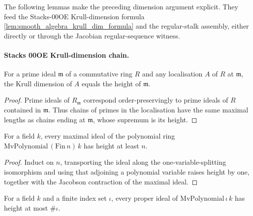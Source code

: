The following lemmas make the preceding dimension argument explicit. They feed
the Stacks-00OE Krull-dimension formula
\cref{lem:smooth_algebra_krull_dim_formula} and the regular-stalk assembly,
either directly or through the Jacobian regular-sequence witness.

\paragraph{Stacks 00OE Krull-dimension chain.}

\begin{lemma}\leanok
  \label{lem:ringKrullDim_localization_eq_height_atPrime}
  For a prime ideal \(\mathfrak m\) of a commutative ring \(R\) and any localisation
  \(A\) of \(R\) at \(\mathfrak m\), the Krull dimension of \(A\) equals the height of
  \(\mathfrak m\).
\end{lemma}

\begin{proof}
  Prime ideals of \(R_{\mathfrak m}\) correspond order-preservingly to
  prime ideals of \(R\) contained in \(\mathfrak m\).  Thus chains of
  primes in the localisation have the same maximal lengths as chains
  ending at \(\mathfrak m\), whose supremum is its height.
\end{proof}

\begin{lemma}
  \label{lem:mvPolynomial_maximalIdeal_height_ge_card}
  For a field \(k\), every maximal ideal of the polynomial ring
  \(\mathrm{MvPolynomial}\,(\mathrm{Fin}\,n)\,k\) has height at least \(n\).
\end{lemma}

\begin{proof}
  Induct on \(n\), transporting the ideal along the
  one-variable-splitting isomorphism and using that adjoining a polynomial variable
  raises height by one, together with the Jacobson contraction of the maximal ideal.
\end{proof}

\begin{lemma}
  \label{lem:mvPolynomial_maximalIdeal_height_le_natCard}
  For a field \(k\) and a finite index set \(\iota\), every proper ideal of
  \(\mathrm{MvPolynomial}\,\iota\,k\) has height at most \(\#\iota\).
\end{lemma}

